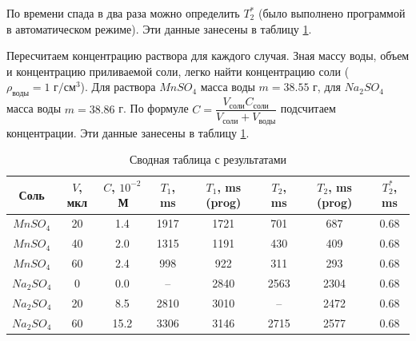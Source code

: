 По времени спада в два раза можно определить $ T_2^* $ (было выполнено программой в автоматическом режиме). Эти данные занесены в таблицу \ref{table:all-T}.

Пересчитаем концентрацию раствора для каждого случая. Зная массу воды, объем и концентрацию приливаемой соли, легко найти концентрацию соли ($ \rho_\text{воды} = 1 \text{ г}/\text{см}^3 $). Для раствора $ Mn SO_4 $ масса воды $ m = 38.55 $ г, для $ Na_2 SO_4 $ масса воды $ m = 38.86 $ г. По формуле $ C = \dfrac{V_\text{соли} C_\text{соли}}{V_\text{соли} + V_\text{воды}} $ подсчитаем концентрации. Эти данные занесены в таблицу \ref{table:all-T}.

\begin{table}[ht]
	\caption{Сводная таблица с результатами}
	\label{table:all-T}
	\centering
	\begin{tabular}{|c|c|c|c|c|c|c|c|}
		\toprule
		Соль &  $V$, мкл & $C$, $10^{-2}$\,М & $T_1$, ms & $T_1$, ms (prog) & $T_2$, ms & $T_2$, ms (prog) & $T_2^*$, ms \\
		\midrule
		$MnSO_4$  	&  20 &  1.4 &  1917 & 1721 &   701 & 687  &  0.68 \\
		$MnSO_4$  	&  40 &  2.0 &  1315 & 1191 &   430 & 409  &  0.68 \\
		$MnSO_4$ 	&  60 &  2.4 &   998 & 922  &   311 & 293  &  0.68 \\
		$Na_2 SO_4$ &   0 &  0.0 &   --  & 2840 &  2563 & 2304 &  0.68 \\
		$Na_2 SO_4$ &  20 &  8.5 &  2810 & 3010 &   --  & 2472 &  0.68 \\
		$Na_2 SO_4$ &  60 & 15.2 &  3306 & 3146 &  2715 & 2577 &  0.68 \\
		\bottomrule
	\end{tabular}
\end{table}

